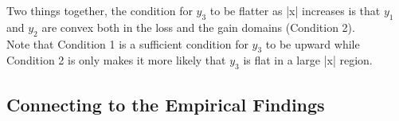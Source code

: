\documentclass[11pt, a4paper]{article}
\begin{document}
\noindent
Two things together, the condition for $y_3$ to be flatter as |x| increases is that $y_1$ and $y_2$ are convex both in the loss and the gain domains (Condition 2). \\

\noindent
Note that Condition 1 is a sufficient condition for $y_3$ to be upward while Condition 2 is only makes it more likely that $y_3$ is flat in a large |x| region.\\

\subsection{Connecting to the Empirical Findings}
\label{section:emp_cond}



\end{document}
